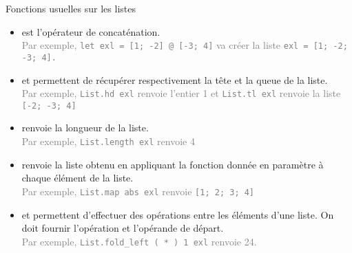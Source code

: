 \documentclass[10pt]{beamer}
\begin{document}
\begin{frame}{\Ctitle}{\stitle}
	\begin{block}{Fonctions usuelles sur les listes}
		\begin{itemize}
			\item<1->  est l'opérateur de concaténation.\\
			\onslide<2->\textcolor{gray}{\small Par exemple, \texttt{let exl = [1; -2] @ [-3; 4]} va créer la liste \mbox{\tt exl = [1; -2; -3; 4].}}
			\item<3->  et  permettent de récupérer respectivement la tête et la queue de la liste.\\
			\onslide<4->\textcolor{gray}{\small Par exemple, \texttt{List.hd exl} renvoie l'entier 1 et \texttt{List.tl exl} renvoie la liste \mbox{\tt [-2; -3; 4]}}
			\item<5->  renvoie la longueur de la liste.\\
			\onslide<6->\textcolor{gray}{\small Par exemple, \texttt{List.length exl} renvoie 4}
			\item<7->  renvoie la liste obtenu en appliquant la fonction donnée en paramètre à chaque élément de la liste.\\
			\onslide<8->\textcolor{gray}{\small Par exemple, \texttt{List.map abs exl} renvoie \mbox{\tt [1; 2; 3; 4]}}
			\item<9->  et  permettent d'effectuer des opérations entre les éléments d'une liste. On doit fournir l'opération et l'opérande de départ.\\
			\onslide<10->\textcolor{gray}{\small Par exemple, \texttt{List.fold_left ( * ) 1 exl} renvoie 24.} 
		\end{itemize}
	\end{block}
\end{frame}
\end{document}
